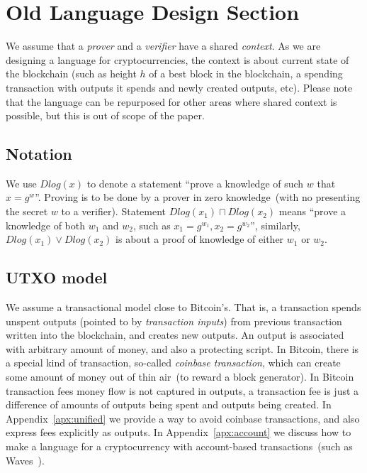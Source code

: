\documentclass[11pt]{article}
\begin{document}
\section{Old Language Design Section}

We assume that a {\em prover} and a {\em verifier} have a shared {\em context}. As we are designing a language for cryptocurrencies, the context is about current state of the blockchain (such as height $h$ of a best block in the blockchain, a spending transaction with outputs it spends and newly created outputs, etc). Please note that the language can be repurposed for other areas where shared context is possible, but this is out of scope of the paper.

\subsection{Notation}

We use $Dlog(x)$ to denote a statement ``prove a knowledge of such $w$ that $x = g^w$''. Proving is to be done by a prover in zero knowledge~(with no presenting the secret $w$ to a verifier). Statement $Dlog(x_1) \sqcap Dlog(x_2)$ means ``prove a knowledge of both $w_1$ and $w_2$, such as $x_1 = g^{w_1}, x_2 = g^{w_2}$'', similarly, $Dlog(x_1) \lor Dlog(x_2)$ is about a proof of knowledge of either $w_1$ or $w_2$.

\subsection{UTXO model}

We assume a transactional model close to Bitcoin's. That is, a transaction spends unspent outputs (pointed to by \emph{transaction inputs}) from previous transaction written into the blockchain, and creates new outputs. An output is associated with arbitrary amount of money, and also a protecting script. In Bitcoin, there is a special kind of transaction, so-called {\em coinbase transaction}, which can create some amount of money out of thin air~(to reward a block generator). In Bitcoin transaction fees money flow is not captured in outputs, a transaction fee is just a difference of amounts of outputs being spent and outputs being created. In Appendix~\ref{apx:unified} we provide a way to avoid coinbase transactions, and also express fees explicitly as outputs. In Appendix~\ref{apx:account} we discuss how to make a language for a cryptocurrency with account-based transactions~(such as Waves~\cite{Waves}).
\end{document}
